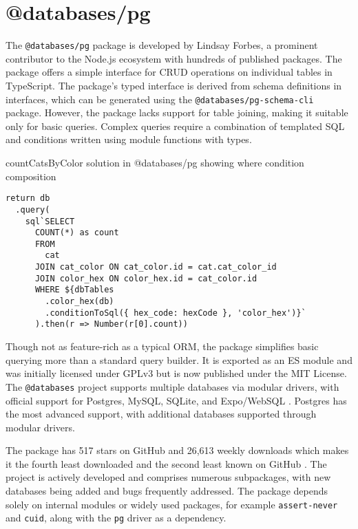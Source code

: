 \section{@databases/pg}
The \texttt{@databases/pg} package is developed by Lindsay Forbes, a prominent
contributor to the Node.js ecosystem with hundreds of published packages. The
package offers a simple interface for CRUD operations on individual tables in
TypeScript. The package's typed interface is derived from schema definitions in
interfaces, which can be generated using the \texttt{@databases/pg-schema-cli}
\cite{pg-schema-cli} package. However, the package lacks support for table
joining, making it suitable only for basic queries. Complex queries require a
combination of templated SQL and conditions written using module functions with
types.

\begin{listing}
    \caption{countCatsByColor solution in @databases/pg showing where condition composition}
    \label{lst:atdatabases/examples}
    \begin{verbatim}
return db
  .query(
    sql`SELECT
      COUNT(*) as count
      FROM
        cat
      JOIN cat_color ON cat_color.id = cat.cat_color_id
      JOIN color_hex ON color_hex.id = cat_color.id
      WHERE ${dbTables
        .color_hex(db)
        .conditionToSql({ hex_code: hexCode }, 'color_hex')}`
      ).then(r => Number(r[0].count))
    \end{verbatim}
\end{listing}

Though not as feature-rich as a typical ORM, the package simplifies basic
querying more than a standard query builder. It is exported as an ES module and
was initially licensed under GPLv3 but is now published under the MIT License.
The \texttt{@databases} project supports multiple databases via modular drivers,
with official support for Postgres, MySQL, SQLite, and Expo/WebSQL
\cite{databases/pg}. Postgres has the most advanced support, with additional
databases supported through modular drivers.

The package has 517 stars on GitHub and 26,613 weekly downloads which makes it
the fourth least downloaded and the second least known on GitHub
\cite{databases/pg/npm}. The project is actively developed and comprises
numerous subpackages, with new databases being added and bugs frequently
addressed. The package depends solely on internal modules or widely used
packages, for example \texttt{assert-never} and \texttt{cuid}, along with the
\texttt{pg} driver as a dependency.

